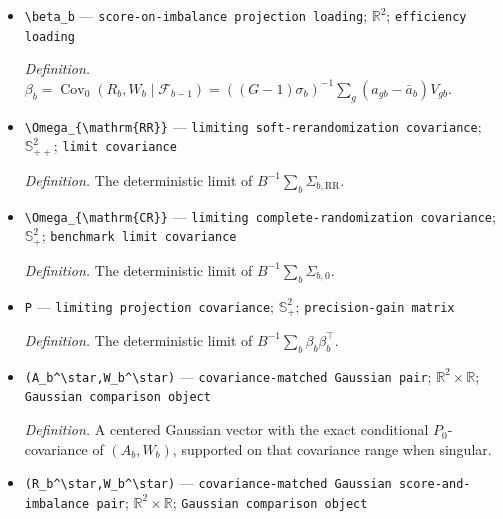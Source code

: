 \documentclass{article}
\begin{document}
\begin{itemize}
  \par\smallskip\noindent\emph{Definition.} \(\Sigma_{b,\mathrm{RR}}=\operatorname{Var}_{\mathrm{RR}}(R_b\mid\mathcal F_{b-1})\).
  \item \texttt{\textbackslash{}\allowbreak{}beta\_\allowbreak{}b} --- \texttt{score-\allowbreak{}on-\allowbreak{}imbalance projection loading}; \(\mathbb R^2\); \texttt{efficiency loading}
  \par\smallskip\noindent\emph{Definition.} \(\beta_b=\operatorname{Cov}_0(R_b,W_b\mid\mathcal F_{b-1})=((G-1)\sigma_b)^{-1}\sum_g(a_{gb}-\bar a_b)V_{gb}\).
  \item \texttt{\textbackslash{}\allowbreak{}Omega\_\allowbreak{}\{\textbackslash{}\allowbreak{}mathrm\{RR\}\allowbreak{}\}\allowbreak{}} --- \texttt{limiting soft-\allowbreak{}rerandomization covariance}; \(\mathbb S_{++}^2\); \texttt{limit covariance}
  \par\smallskip\noindent\emph{Definition.} The deterministic limit of \(B^{-1}\sum_b\Sigma_{b,\mathrm{RR}}\).
  \item \texttt{\textbackslash{}\allowbreak{}Omega\_\allowbreak{}\{\textbackslash{}\allowbreak{}mathrm\{CR\}\allowbreak{}\}\allowbreak{}} --- \texttt{limiting complete-\allowbreak{}randomization covariance}; \(\mathbb S_+^2\); \texttt{benchmark limit covariance}
  \par\smallskip\noindent\emph{Definition.} The deterministic limit of \(B^{-1}\sum_b\Sigma_{b,0}\).
  \item \texttt{P} --- \texttt{limiting projection covariance}; \(\mathbb S_+^2\); \texttt{precision-\allowbreak{}gain matrix}
  \par\smallskip\noindent\emph{Definition.} The deterministic limit of \(B^{-1}\sum_b\beta_b\beta_b^\top\).
  \item \texttt{(A\_\allowbreak{}b\textasciicircum{}\textbackslash{}\allowbreak{}star,\allowbreak{}W\_\allowbreak{}b\textasciicircum{}\textbackslash{}\allowbreak{}star)} --- \texttt{covariance-\allowbreak{}matched Gaussian pair}; \(\mathbb R^2\times\mathbb R\); \texttt{Gaussian comparison object}
  \par\smallskip\noindent\emph{Definition.} A centered Gaussian vector with the exact conditional \(P_0\)-covariance of \((A_b,W_b)\), supported on that covariance range when singular.
  \item \texttt{(R\_\allowbreak{}b\textasciicircum{}\textbackslash{}\allowbreak{}star,\allowbreak{}W\_\allowbreak{}b\textasciicircum{}\textbackslash{}\allowbreak{}star)} --- \texttt{covariance-\allowbreak{}matched Gaussian score-\allowbreak{}and-\allowbreak{}imbalance pair}; \(\mathbb R^2\times\mathbb R\); \texttt{Gaussian comparison object}

\end{itemize}
\end{document}
